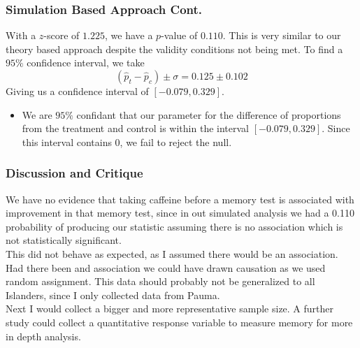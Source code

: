 \documentclass{beamer}
\begin{document}
\begin{frame}
\frametitle{Simulation Based Approach Cont.}
With a $z$-score of $1.225$, we have a $p$-value of $0.110$. This is very similar to our theory based approach despite the validity conditions not being met.
To find a $95\%$ confidence interval, we take 
\[
	(\hat{p}_t - \hat{p}_c) \pm \sigma = 0.125 \pm 0.102
\]
Giving us a confidence interval of $[-0.079,0.329]$. \pause
\begin{itemize}
	\item We are $95\%$ confidant that our parameter for the difference of proportions from the treatment and control is within the interval $[-0.079,0.329]$. Since this interval contains 0, we fail to reject the null.
\end{itemize}
\end{frame}

\begin{frame}
\frametitle{Discussion and Critique}

We have no evidence that taking caffeine before a memory test is associated with improvement in that memory test, since in out simulated analysis we had a 0.110 probability of producing our statistic assuming there is no association which is not statistically significant. \\ \pause
\vspace{10pt}
This did not behave as expected, as I assumed there would be an association. Had there been and association we could have drawn causation as we used random assignment. This data should probably not be generalized to all Islanders, since I only collected data from Pauma. \\ \pause
\vspace{10pt}
Next I would collect a bigger and more representative sample size. A further study could collect a quantitative response variable to measure memory for more in depth analysis.
\end{frame}
\end{document}
